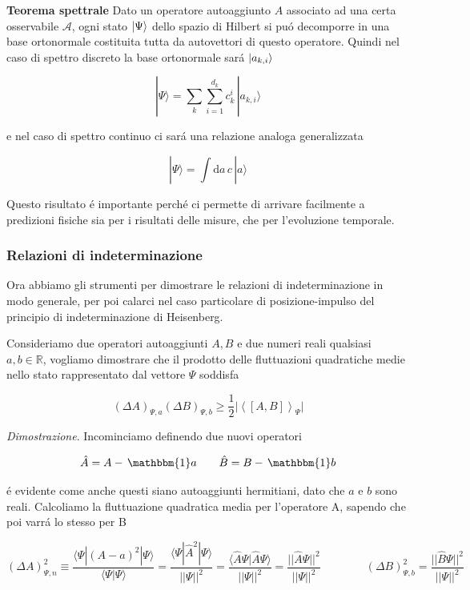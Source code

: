 \begin{theorem} \textbf{Teorema spettrale}
	Dato un operatore autoaggiunto $A$ associato ad una certa osservabile $\mathcal{A}$, ogni stato $\ket{\Psi}$ dello spazio di Hilbert si pu\'o decomporre in una base ortonormale costituita tutta da autovettori di questo operatore. Quindi nel caso di spettro discreto la base ortonormale sar\'a $\ket{a_{k,i}}$
	
	$$|\Psi\rangle=\sum_{k}\sum_{i=1}^{d_{k}}c_{k}^{i}\,|a_{k,i}\rangle$$
	
	e nel caso di spettro continuo ci sar\'a una relazione analoga generalizzata
	
	$$|\Psi\rangle=\int\mathrm{d}a\,c\,|a\rangle$$
	
	Questo risultato \'e importante perch\'e ci permette di arrivare facilmente a predizioni fisiche sia per i risultati delle misure, che per l'evoluzione temporale.	
\end{theorem}


\subsubsection{Relazioni di indeterminazione}

Ora abbiamo gli strumenti per dimostrare le relazioni di indeterminazione in modo generale, per poi calarci nel caso particolare di posizione-impulso del principio di indeterminazione di Heisenberg.

Consideriamo due operatori autoaggiunti $A, B$ e due numeri reali qualsiasi $a, b \in \mathbb{R}$, vogliamo dimostrare che il prodotto delle fluttuazioni quadratiche medie nello stato rappresentato dal vettore $\Psi$ soddisfa

$$(\Delta A)_{\Psi,a}(\Delta B)_{\Psi,b}\geq\frac{1}{2}\vert\left<[A,B]\right>_{\Psi}\vert$$

\textit{Dimostrazione}. Incominciamo definendo due nuovi operatori

$$\hat{A}=A-\,\mathbbm{1}a\qquad\hat{B}=B-\,\mathbbm{1}b$$

\'e evidente come anche questi siano autoaggiunti hermitiani, dato che $a$ e $b$ sono reali. Calcoliamo la fluttuazione quadratica media per l'operatore A, sapendo che poi varr\'a lo stesso per B

$$(\Delta A)^{2}_{\Psi,n}\equiv\frac{\langle\Psi|(A-a)^{2}|\Psi\rangle}{\langle\Psi|\Psi\rangle}=\frac{\langle\Psi|\hat{A}^{2}|\Psi\rangle}{||\Psi||^{2}}=\frac{\langle\hat{A}\Psi|\hat{A}\Psi\rangle}{||\Psi||^{2}}=\frac{||\hat{A}\Psi||^{2}}{||\Psi||^{2}}\qquad\qquad(\Delta B)^{2}_{\Psi,b}=\frac{||\hat{B}\Psi||^{2}}{||\Psi||^{2}}$$ 

